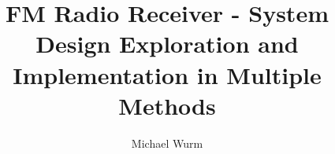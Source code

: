 \documentclass[master,english,smartquotes]{hgbthesis}
\title{FM Radio Receiver - System Design Exploration and Implementation in Multiple Methods}
\author{Michael Wurm}
\begin{document}

\frontmatter							%

\maketitle
\tableofcontents




\mainmatter          			%












\appendix                                         %


\backmatter



\MakeBibliography                        				%



\end{document}
